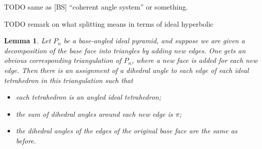 \documentclass[11pt]{amsart}
\theoremstyle{plain}
\newtheorem{lemma}[theorem]{Lemma}
\theoremstyle{definition}
\begin{document}
TODO same as [BS] ``coherent angle system'' or something.

TODO remark on what splitting means in terms of ideal hyperbolic


\begin{lemma}
\label{l:pyramid_decomp}
Let $P_n$ be a base-angled ideal pyramid, and suppose we are given a
decomposition of the base face into triangles by adding new edges.  One gets an
obvious corresponding triangulation of $P_n$, where a new face is added for each
new edge. Then there is an assignment of a dihedral angle to each edge of each
ideal tetrahedron in this triangulation such that
\begin{itemize}
\item each tetrahedron is an angled ideal tetrahedron;
\item the sum of dihedral angles around each new edge is $\pi$;
\item the dihedral angles of the edges of the original base face are the same as
	before.
\end{itemize} 
\end{lemma}
\end{document}
